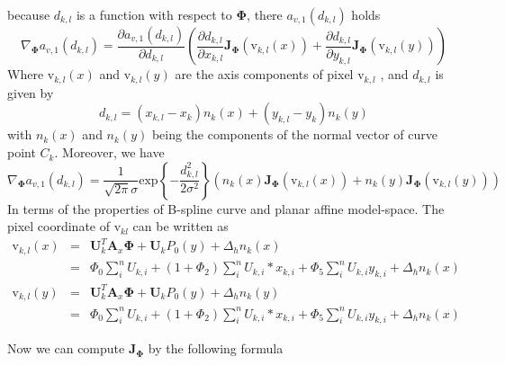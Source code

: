 because $d_{k,l}$ is a function with respect to $\mathbf{\Phi}$, there
$a_{v,1}(d_{k,l})$ holds
\begin{equation}
  \label{eq:nablaa}
\nabla_{\mathbf{\Phi}} a_{v,1}(d_{k,l}) = \frac{\partial a_{v,1}(d_{k,l})}{\partial d_{k,l}}
\left( \frac{\partial d_{k,l}}{\partial x_{k,l}}\mathbf{J}_{\mathbf{\Phi}}(\mathrm{v}_{k,l}(x)) + \frac{\partial d_{k,l}}{\partial y_{k,l}}\mathbf{J}_{\mathbf{\Phi}}(\mathrm{v}_{k,l}(y))
 \right)  
\end{equation}
Where $\mathrm{v}_{k,l}(x)$ and $\mathrm{v}_{k,l}(y)$ are the axis
components of pixel $\mathrm{v}_{k,l}$ , and $d_{k,l}$ is given by
\begin{equation}
  \label{eq:diskl}
  d_{k,l} = (x_{k,l} - x_{k})n_{k}(x) +(y_{k,l} - y_{k}) n_{k}(y)
\end{equation}
with $n_{k}(x)$ and $n_{k}(y)$ being the components of the normal vector of
curve point $C_{k}$. Moreover, we have
\begin{equation}
  \label{eq:nabladkl}
  \nabla_{\mathbf{\Phi}} a_{v,1}(d_{k,l}) = \frac{1}{\sqrt{2\pi}\sigma} \mathrm{exp}\left\{ -\frac{d_{k,l}^2}{2\sigma^2} \right\}
\left( n_k(x)\mathbf{J}_{\mathbf{\Phi}}(\mathrm{v}_{k,l}(x)) + n_k(y)\mathbf{J}_{\mathbf{\Phi}}(\mathrm{v}_{k,l}(y))
 \right) 
\end{equation}
In terms of the properties of  B-spline curve  and planar affine
model-space. The pixel coordinate of $\mathrm{v}_{kl}$ can be written
as
\begin{eqnarray}
  \label{eq:vkl}
\mathrm{v}_{k,l}(x) &= & \mathbf{U}_k^{T}\mathbf{A}_x \mathbf{\Phi} + \mathbf{U}_k P_0(y) + \Delta_h n_k(x) \\
          &=&\Phi_0\sum_{i}^nU_{k,i} +
          (1+\Phi_2)\sum_{i}^nU_{k,i}*x_{k,i} + \Phi_{5}\sum_{i}^n
          U_{k,i}y_{k,i} + \Delta_h n_k(x)\\
\mathrm{v}_{k,l}(y) &=& \mathbf{U}_k^{T}\mathbf{A}_x \mathbf{\Phi} +
\mathbf{U}_k P_0(y) + \Delta_h n_k(y) \\
          &=&\Phi_0\sum_{i}^nU_{k,i} +
          (1+\Phi_2)\sum_{i}^nU_{k,i}*x_{k,i} + \Phi_{5}\sum_{i}^n
          U_{k,i}y_{k,i} + \Delta_h n_k(x)
\end{eqnarray}

Now we can compute $\mathbf{J}_{\mathbf{\Phi}}$ by the following
formula

